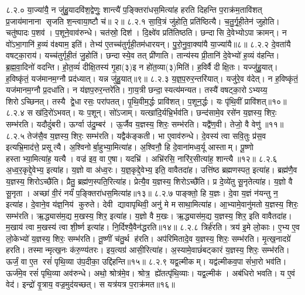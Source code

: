 ८.२.०
या॒ज्या॑यै॒ न जु॑हु॒यादवि॑श॒द्वेणुः॒ शान्त्यै॑ प॒ङ्क्तिरा॑धस॒मित्या॑ह हरति दिहन्ति प॒राक्र॑म॒तावि॑शत् प्र॒जाय॑मानाना सृजति श॒न्त्वाया॒ष्टौ च॑॥ २॥
८.२.१
सा॒वि॒त्रं जु॑होति॒ प्रति॑ष्ठित्यै। च॒तु॒र्गृ॒ही॒तेन॑ जुहोति। चतु॑ष्पादः प॒शव॑। प॒शूने॒वाव॑रुन्धे। चत॑स्रो॒ दिश॑। दि॒क्ष्वे॑व प्रति॑तिष्ठति। छन्दासि दे॒वेभ्योऽपाक्रामन्। न वो॑ऽभा॒गानि॑ ह॒व्यं व॑क्ष्याम॒ इति॑। तेभ्य॑ ए॒तच्च॑तुर्गृही॒तम॑धारयन्। पु॒रो॒नु॒वा॒क्या॑यै या॒ज्या॑यै॥८॥
८.२.२
दे॒वता॑यै वषट्का॒राय॑। यच्च॑तुर्गृही॒तं जु॒होति॑। छन्दास्ये॒व तत् प्री॑णाति। तान्य॑स्य प्री॒तानि॑ दे॒वेभ्यो॑ ह॒व्यं व॑हन्ति। ब्र॒ह्म॒वा॒दिनो॑ वदन्ति। हो॒त॒व्यं॑ दीक्षि॒तस्य॑ गृ॒हा(३)इ न हो॑त॒व्या(३)मिति॑। ह॒विर्\mbox{}वै दीक्षि॒तः। यज्जु॑हु॒यात्। ह॒विष्कृ॑तं॒ यज॑मानम॒ग्नौ प्रद॑ध्यात्। यन्न जु॑हु॒यात्॥९॥
८.२.३
य॒ज्ञ॒प॒रुर॒न्तरि॑यात्। यजु॑रे॒व व॑देत्। न ह॒विष्कृ॑तं॒ यज॑मानम॒ग्नौ प्र॒दधा॑ति। न य॑ज्ञप॒रुर॒न्तरे॑ति। गा॒य॒त्री छन्दा॒स्यत्य॑मन्यत। तस्यै॑ वषट्का॒रोऽभ्यय्य॒ शिरोऽच्छिनत्। तस्यै द्वे॒धा रसः॒ परा॑पतत्। पृ॒थि॒वीम॒र्द्धः प्रावि॑शत्। प॒शून॒र्द्धः। यः पृ॑थि॒वीं प्रावि॑शत्॥१०॥
८.२.४
स ख॑दि॒रो॑ऽभवत्। यः प॒शून्। सो॑ऽजाम्। यत्खा॑दि॒र्यभ्रि॒र्भव॑ति। छन्द॑सामे॒व रसे॑न य॒ज्ञस्य॒ शिरः॒ सम्भ॑रति। यदौदुं॑बरी। ऊर्ग्वा उ॑दु॒म्बर॑। ऊ॒र्जैव य॒ज्ञस्य॒ शिरः॒ सम्भ॑रति। यद्वै॑ण॒वी। तेजो॒ वै वेणु॑॥११॥
८.२.५
तेज॑सै॒व य॒ज्ञस्य॒ शिरः॒ सम्भ॑रति। यद्वैक॑ङ्कती। भा ए॒वाव॑रुन्धे। दे॒वस्य॑ त्वा सवि॒तुः प्र॑स॒व इत्यभ्रि॒माद॑त्ते॒ प्रसूत्यै। अ॒श्विनोर्बा॒हुभ्या॒मित्या॑ह। अ॒श्विनौ॒ हि दे॒वाना॑मध्व॒र्यू आस्ताम्। पू॒ष्णो हस्ताभ्या॒मित्या॑ह॒ यत्यै। वज्र॑ इव॒ वा ए॒षा। यदभ्रि॑। अभ्रि॑रसि॒ नारि॑र॒सीत्या॑ह॒ शान्त्यै॥१२॥
८.२.६
अ॒ध्व॒र॒कृद्दे॒वेभ्य॒ इत्या॑ह। य॒ज्ञो वा अ॑ध्व॒रः। य॒ज्ञ॒कृद्दे॒वेभ्य॒ इति॒ वावैतदा॑ह। उत्ति॑ष्ठ ब्रह्मणस्पत॒ इत्या॑ह। ब्रह्म॑णै॒व य॒ज्ञस्य॒ शिरोऽच्छै॑ति। प्रैतु॒ ब्रह्म॑ण॒स्पति॒रित्या॑ह। प्रेत्यै॒व य॒ज्ञस्य॒ शिरोऽच्छै॑ति। प्र दे॒व्ये॑तु सू॒नृतेत्या॑ह। य॒ज्ञो वै सू॒नृता। अच्छा॑ वी॒रं नर्यं॑ प॒ङ्क्तिरा॑धस॒मित्या॑ह॥१३॥
८.२.७
पाङ्क्तो॒ हि य॒ज्ञः। दे॒वा य॒ज्ञं न॑यन्तु न॒ इत्या॑ह। दे॒वाने॒व य॑ज्ञ॒निय॑ कुरुते। देवी द्यावापृथिवी॒ अनु॑ मे मसाथा॒मित्या॑ह। आ॒भ्यामे॒वानु॑मतो य॒ज्ञस्य॒ शिरः॒ सम्भ॑रति। ऋ॒द्ध्यास॑म॒द्य म॒खस्य॒ शिर॒ इत्या॑ह। य॒ज्ञो वै म॒खः। ऋ॒द्ध्यास॑म॒द्य य॒ज्ञस्य॒ शिर॒ इति वावैतदा॑ह। म॒खाय॑ त्वा म॒खस्य॑ त्वा शी॒र्ष्ण इत्या॑ह। नि॒र्दिश्यै॒वैन॑द्धरति॥१४॥
८.२.८
त्रिर्\mbox{}ह॑रति। त्रय॑ इ॒मे लो॒काः। ए॒भ्य ए॒व लो॒केभ्यो॑ य॒ज्ञस्य॒ शिरः॒ सम्भ॑रति। तू॒ष्णीं च॑तु॒र्थ ह॑रति। अप॑रिमितादे॒व य॒ज्ञस्य॒ शिरः॒ सम्भ॑रति। मृ॒त्ख॒नादग्रे॑ हरति। तस्मान्मृत्ख॒नः क॑रु॒ण्य॑तरः। इय॒त्यग्र॑ आसी॒रित्या॑ह। अ॒स्यामे॒वाछं॑बट्कारं य॒ज्ञस्य॒ शिरः॒ सम्भ॑रति। ऊर्जं॒ वा ए॒त रसं॑ पृथि॒व्या उ॑प॒दीका॒ उद्दि॑हन्ति॥१५॥
८.२.९
यद्व॒ल्मीकम्। यद्व॑ल्मीकव॒पा सं॑भा॒रो भव॑ति। ऊर्ज॑मे॒व रसं॑ पृथि॒व्या अव॑रुन्धे। अथो॒ श्रोत्र॑मे॒व। श्रोत्र॒ ह्ये॑तत्पृ॑थि॒व्याः। यद्व॒ल्मीक॑। अब॑धिरो भवति। य ए॒वं वेद॑। इन्द्रो॑ वृ॒त्राय॒ वज्र॒मुद॑यच्छत्। स यत्र॑यत्र प॒राक्र॑मत॥१६॥
